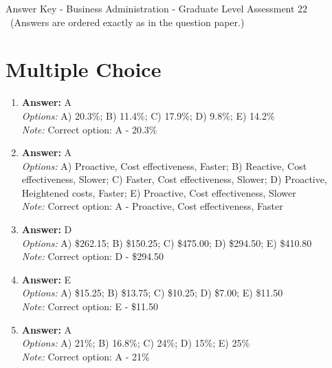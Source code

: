 \documentclass[12pt]{article}
\begin{document}
\begin{center}
Answer Key - Business Administration - Graduate Level Assessment 22 \
\small (Answers are ordered exactly as in the question paper.)
\end{center}

\section*{Multiple Choice}
\begin{enumerate}[label=\arabic*.]
\item \textbf{Answer:} A
\\ \textit{Options:} A) 20.3\%; B) 11.4\%; C) 17.9\%; D) 9.8\%; E) 14.2\%
\\ \textit{Note:} Correct option: A - 20.3\%
\item \textbf{Answer:} A
\\ \textit{Options:} A) Proactive, Cost effectiveness, Faster; B) Reactive, Cost effectiveness, Slower; C) Faster, Cost effectiveness, Slower; D) Proactive, Heightened costs, Faster; E) Proactive, Cost effectiveness, Slower
\\ \textit{Note:} Correct option: A - Proactive, Cost effectiveness, Faster
\item \textbf{Answer:} D
\\ \textit{Options:} A) \$262.15; B) \$150.25; C) \$475.00; D) \$294.50; E) \$410.80
\\ \textit{Note:} Correct option: D - \$294.50
\item \textbf{Answer:} E
\\ \textit{Options:} A) \$15.25; B) \$13.75; C) \$10.25; D) \$7.00; E) \$11.50
\\ \textit{Note:} Correct option: E - \$11.50
\item \textbf{Answer:} A
\\ \textit{Options:} A) 21\%; B) 16.8\%; C) 24\%; D) 15\%; E) 25\%
\\ \textit{Note:} Correct option: A - 21\%
\end{enumerate}
\end{document}
